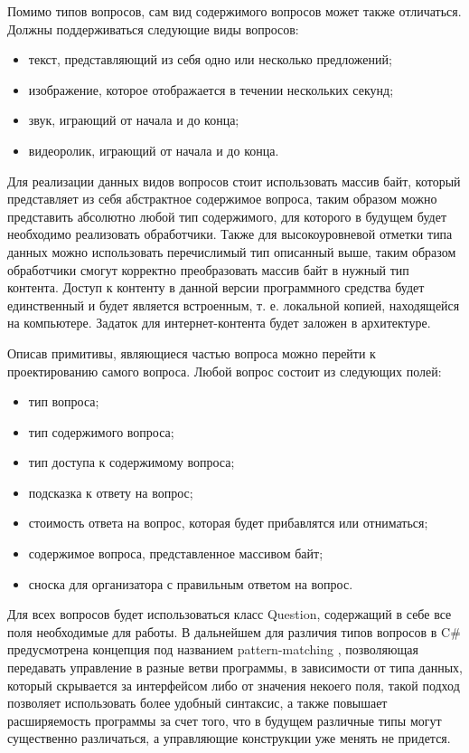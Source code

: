 Помимо типов вопросов, сам вид содержимого вопросов может также отличаться. Должны поддерживаться следующие виды вопросов:

\begin{itemize}
	\item текст, представляющий из себя одно или несколько предложений;
	\item изображение, которое отображается в течении нескольких секунд;
	\item звук, играющий от начала и до конца;
	\item видеоролик, играющий от начала и до конца.
\end{itemize}

Для реализации данных видов вопросов стоит использовать массив байт, который представляет из себя абстрактное содержимое вопроса, таким образом
можно представить абсолютно любой тип содержимого, для которого в будущем будет необходимо реализовать обработчики. Также для высокоуровневой
отметки типа данных можно использовать перечислимый тип описанный выше, таким образом обработчики смогут корректно преобразовать массив байт в нужный тип контента.
Доступ к контенту в данной версии программного средства будет единственный и будет является встроенным, т. е. локальной копией, находящейся на компьютере.
Задаток для интернет-контента будет заложен в архитектуре.

Описав примитивы, являющиеся частью вопроса можно перейти к проектированию самого вопроса. Любой вопрос состоит из следующих полей:

\begin{itemize}
	\item тип вопроса;
	\item тип содержимого вопроса;
	\item тип доступа к содержимому вопроса;
	\item подсказка к ответу на вопрос;
	\item стоимость ответа на вопрос, которая будет прибавлятся или отниматься;
	\item содержимое вопроса, представленное массивом байт;
	\item сноска для организатора с правильным ответом на вопрос.
\end{itemize}

Для всех вопросов будет использоваться класс Question, содержащий в себе все поля необходимые для работы. 
В дальнейшем для различия типов вопросов в C\# предусмотрена концепция под названием pattern-matching \cite{msdn_pattern_matching}, позволяющая передавать управление в разные ветви программы, в зависимости
от типа данных, который скрывается за интерфейсом либо от значения некоего поля, такой подход позволяет использовать более удобный синтаксис, а также повышает расширяемость программы за счет того, что в будущем
различные типы могут существенно различаться, а управляющие конструкции уже менять не придется.

